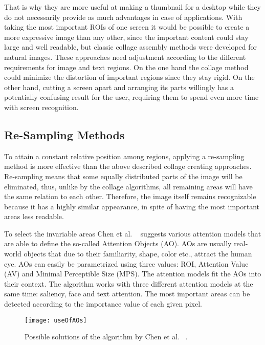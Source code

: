 \documentclass[draft,final]{vutinfth} %
\begin{document}
	That is why they are more useful at making a thumbnail for a desktop while they do not necessarily provide as much advantages in case of applications.
	With taking the most important ROIs of one screen it would be possible to create a  more expressive image than any other, since the important content could stay large and well readable, but classic collage assembly methods were developed for natural images. 
	These approaches need adjustment according to the different requirements for image and text regions.
	On the one hand the collage method could minimize the distortion of important regions since they stay rigid.
	On the other hand, cutting a screen apart and arranging its parts willingly has a potentially confusing result for the user, requiring them to spend even more time with screen recognition.
	
	\subsection{Re-Sampling Methods}
	\label{relatedWork:resampling}
	To attain a constant relative position among regions, applying a re-sampling method is more effective than the above described collage creating approaches.
	Re-sampling means that some equally distributed parts of the image will be eliminated, thus, unlike by the collage algorithms, all remaining areas will have the same relation to each other.
	Therefore, the image itself remains recognizable because it has a highly similar appearance, in spite of having the most important areas less readable.\par 
	To select the invariable areas Chen et al. ~\cite{chen2003visual} suggests various attention models that are able to define the so-called Attention Objects (AO).
	AOs are usually real-world objects that due to their familiarity, shape, color etc., attract the human eye.
	AOs can easily be parametrized using three values: ROI, Attention Value (AV) and Minimal Perceptible Size (MPS).
	The attention models fit the AOs into their context.
	The algorithm works with three different attention models at the same time: saliency, face and text attention.
	The most important areas can be detected according to the importance value of each given pixel.\par 
	\begin{figure}[h]
		\centering		
		\texttt{[image: useOfAOs]}
		\caption{Possible solutions of the algorithm by Chen et al. ~\cite{chen2003visual}.}
		\label{fig:useOfAOs}
	\end{figure}
\end{document}
